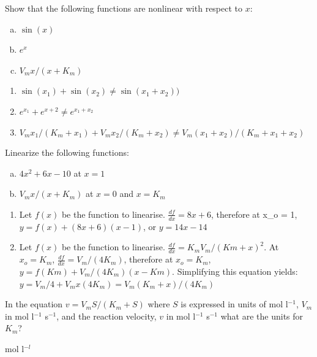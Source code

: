 \documentclass[12pt]{article}
\begin{document}
\begin{question}
Show that the following functions are nonlinear with respect to $x$:
\begin{enumerate}[a)]
\item $\sin (x)$
\item $e^x$
\item $V_m x/(x + K_m)$
\end{enumerate}
\end{question}
\begin{solution}
\begin{enumerate}
  \item $ \sin(x_1)+\sin(x_2) \neq \sin(x_1 + x_2)) $
  \item $ e^{x_1} + e^{x+2} \neq  e^{x_1 + x_2} $
  \item $ V_m x_1/(K_m + x_1) + V_m x_2/(K_m + x_2) \neq V_m (x_1 + x_2)/(K_m + x_1 + x_2)$
\end{enumerate}
\end{solution}


\begin{question}
Linearize the following functions:
\begin{enumerate}[a)]
\item $4 x^2 + 6 x - 10$ at $x = 1$
\item $V_m x/(x + K_m)$ at $x = 0$ and $x = K_m$
\end{enumerate}
\end{question}
\begin{solution}
\begin{enumerate}
\item Let $f(x)$ be the function to linearise. $\frac{df}{dx} = 8 x + 6 $, therefore at x_o = 1, $y = f(x) + (8 x + 6) (x - 1)$, or $y = 14 x - 14 $

\item Let $f(x)$ be the function to linearise. $\frac{df}{dx} = K_m V_m /(Km + x)^2$. At $x_o = K_m$, $\frac{df}{dx} = V_m/(4 K_m)$, therefore at $x_o = K_m$, $y = f(Km) + V_m/(4 K_m) (x - Km)$. Simplifying this equation yields:
 $ y = V_m/4 +  V_m x (4 K_m) = V_m(K_m + x)/(4 K_m)$
\end{enumerate}
\end{solution}


\begin{question}
In the equation $v = V_m S/(K_m + S)$ where $S$ is expressed in units of mol l$^{-1}$, $V_m$ in mol l$^{-1}$ s$^{-1}$, and the reaction velocity, $v$ in mol l$^{-1}$ s$^{-1}$ what are the units for $K_m$?
\end{question}
\begin{solution}
mol l$^{-l}$
\end{solution}
\end{document}
